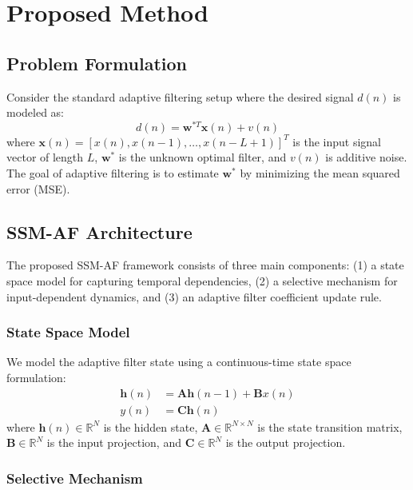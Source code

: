 \documentclass[a4paper,fleqn]{cas-sc}
\begin{document}
\section{Proposed Method}\label{sec:method}

\subsection{Problem Formulation}

Consider the standard adaptive filtering setup where the desired signal $d(n)$ is modeled as:
\begin{equation}
d(n) = \mathbf{w}^{*T} \mathbf{x}(n) + v(n)
\end{equation}
where $\mathbf{x}(n) = [x(n), x(n-1), \ldots, x(n-L+1)]^T$ is the input signal vector of length $L$, $\mathbf{w}^*$ is the unknown optimal filter, and $v(n)$ is additive noise. The goal of adaptive filtering is to estimate $\mathbf{w}^*$ by minimizing the mean squared error (MSE).

\subsection{SSM-AF Architecture}

The proposed SSM-AF framework consists of three main components: (1) a state space model for capturing temporal dependencies, (2) a selective mechanism for input-dependent dynamics, and (3) an adaptive filter coefficient update rule.

\subsubsection{State Space Model}

We model the adaptive filter state using a continuous-time state space formulation:
\begin{align}
\mathbf{h}(n) &= \mathbf{A} \mathbf{h}(n-1) + \mathbf{B} x(n) \\
y(n) &= \mathbf{C} \mathbf{h}(n)
\end{align}
where $\mathbf{h}(n) \in \mathbb{R}^{N}$ is the hidden state, $\mathbf{A} \in \mathbb{R}^{N \times N}$ is the state transition matrix, $\mathbf{B} \in \mathbb{R}^{N}$ is the input projection, and $\mathbf{C} \in \mathbb{R}^{N}$ is the output projection.

\subsubsection{Selective Mechanism}
\end{document}

